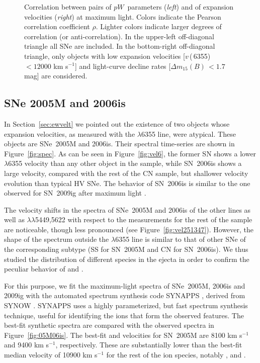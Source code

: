 \documentclass[apj]{emulateapj-rtx4}
\newcommand{\ew}{$pW$}
\newcommand{\vsix}{$v$\,(\ion{Si}{2}\,6355)}
\newcommand{\dm}{$\Delta m_{15}(B)$}
\begin{document}
\begin{figure}[htpb]%
\caption{Correlation between pairs of \ew\ parameters ({\em left}) and
  of expansion velocities ({\em right}) at maximum
  light. Colors indicate the Pearson correlation coefficient
  $\rho$. Lighter colors indicate larger degrees of correlation (or
  anti-correlation). In the 
  upper-left off-diagonal triangle all SNe are included. In the bottom-right
  off-diagonal triangle, only objects with low expansion velocities
  [\vsix\,$<12000$ km s$^{-1}$] and light-curve  
  decline rates [\dm\,$< 1.7$ mag] are considered.\label{fig:ewvelcorr}} 
\end{figure}

\subsection{SNe 2005M and 2006is}
\label{sec:05M06is}

In Section~\ref{sec:ewvelt} we pointed out the existence of two objects
whose expansion velocities, as measured with the 
$\lambda$6355 line, were atypical. These objects are SNe~2005M and
2006is. Their spectral time-series are shown in
Figure~\ref{fig:spec}. As can be seen in Figure~\ref{fig:vel6}, the
former SN shows a lower   $\lambda$6355
velocity than any other object in the sample,
while SN~2006is shows a large velocity, compared with the rest of the CN
sample, but shallower velocity evolution than typical HV SNe. The
behavior of SN~2006is is similar to the one observed for SN~2009ig
after maximum light \citep{foley12}. 

The velocity shifts in the spectra of SNe~2005M and 2006is of the other 
 lines as well as  $\lambda\lambda$5449,5622
with respect to the measurements for the rest of the sample are noticeable, 
though less pronounced (see Figure~\ref{fig:vel251347}). However, the
shape of the spectrum outside 
the  $\lambda$6355 line is similar to that of other SNe of
the corresponding subtype (SS for SN~2005M and CN for SN~2006is). We thus
studied the distribution of different species in the ejecta in order
to confirm the peculiar behavior of  and . 

For this purpose, we fit the maximum-light spectra of SNe~2005M, 2006is
and 2009ig with the automated spectrum synthesis code SYNAPPS
\citep{thomas11a}, derived from SYNOW \citep{fisher00}. SYNAPPS
uses a highly parameterized, but fast spectrum synthesis technique,
useful for identifying the ions that form the observed features. The
best-fit synthetic spectra are compared with the observed spectra in
Figure~\ref{fig:05M06is}. The best-fit  and  velocities for
SN~2005M are 8100 km s$^{-1}$ and 9400 km s$^{-1}$, respectively. These are
substantially lower than the best-fit median velocity of 10900 km s$^{-1}$
for the rest of the ion species, notably ,  and
. 
\end{document}
